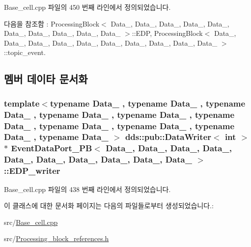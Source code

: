 Base\+\_\+cell.\+cpp 파일의 450 번째 라인에서 정의되었습니다.



다음을 참조함 \+:  Processing\+Block$<$ Data\+\_, Data\+\_, Data\+\_, Data\+\_, Data\+\_, Data\+\_, Data\+\_, Data\+\_, Data\+\_, Data\+\_ $>$\+::\+E\+DP, Processing\+Block$<$ Data\+\_, Data\+\_, Data\+\_, Data\+\_, Data\+\_, Data\+\_, Data\+\_, Data\+\_, Data\+\_, Data\+\_ $>$\+::topic\+\_\+event.



\subsection{멤버 데이타 문서화}
\subsubsection[{\texorpdfstring{E\+D\+P\+\_\+writer}{EDP_writer}}]{\setlength{\rightskip}{0pt plus 5cm}template$<$typename Data\+\_ , typename Data\+\_ , typename Data\+\_ , typename Data\+\_ , typename Data\+\_ , typename Data\+\_ , typename Data\+\_ , typename Data\+\_ , typename Data\+\_ , typename Data\+\_ $>$ dds\+::pub\+::\+Data\+Writer$<$ int $>$ $\ast$ {\bf Event\+Data\+Port\+\_\+\+PB}$<$ Data\+\_, Data\+\_, Data\+\_, Data\+\_, Data\+\_, Data\+\_, Data\+\_, Data\+\_, Data\+\_, Data\+\_ $>$\+::E\+D\+P\+\_\+writer}\hypertarget{classEventDataPort__PB_af4f01ada6acf6d431c9d8e799f9b1ad0}{}\label{classEventDataPort__PB_af4f01ada6acf6d431c9d8e799f9b1ad0}


Base\+\_\+cell.\+cpp 파일의 438 번째 라인에서 정의되었습니다.



이 클래스에 대한 문서화 페이지는 다음의 파일들로부터 생성되었습니다.\+:\begin{DoxyCompactItemize}
\item 
src/\hyperlink{Base__cell_8cpp}{Base\+\_\+cell.\+cpp}\item 
src/\hyperlink{Processing__block__references_8h}{Processing\+\_\+block\+\_\+references.\+h}\end{DoxyCompactItemize}
